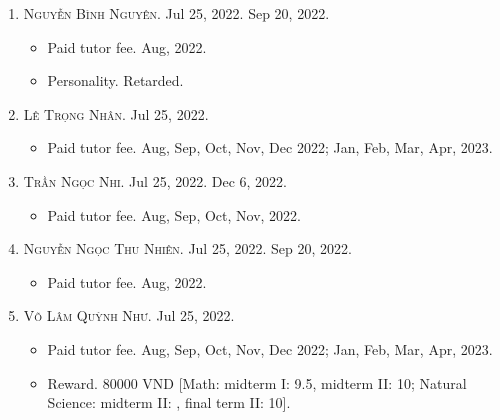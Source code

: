 \documentclass{article}
\begin{document}
\begin{enumerate}
	\begin{itemize}
		\item {\sf Paid tutor fee.} Aug, Sep, Oct, Nov, Dec 2022; Jan, Feb, Mar, Apr, 2023.
		\item {\sf Personality.} Introverted.
		\item {\sf Reward.} 1-euro coin $+$ 140000 VND [Math: midterm I: 9.5, final term I: 9, midterm II: 9.8, final term II: 9.75, final term: 9.75; Natural Science: midterm I: 10, final term I: 9.7, midterm II: ?, final term II: 9.5].
		\item {\sf Score.} \href{https://github.com/NQBH/hobby/blob/master/STEM/student/Nguyen_Nhu_Ngoc_grade_6_1st_semester.jpg}{NNN's 1st semester}.\footnote{The abbreviation of her name should not be confused with No Nut November.}
	\end{itemize}
	\item \textsc{Nguyễn Bình Nguyên.} {\sf[In]} Jul 25, 2022. {\sf[Out]} Sep 20, 2022.
	\begin{itemize}
		\item {\sf Paid tutor fee.} Aug, 2022.
		\item {\sf Personality.} Retarded.
	\end{itemize}
	\item \textsc{Lê Trọng Nhân.} {\sf[In]} Jul 25, 2022.
	\begin{itemize}
		\item {\sf Paid tutor fee.} Aug, Sep, Oct, Nov, Dec 2022; Jan, Feb, Mar, Apr, 2023.
	\end{itemize}
	\item \textsc{Trần Ngọc Nhi.} {\sf[In]} Jul 25, 2022. {\sf[Out]} Dec 6, 2022.
	\begin{itemize}
		\item {\sf Paid tutor fee.} Aug, Sep, Oct, Nov, 2022.
	\end{itemize}
	\item \textsc{Nguyễn Ngọc Thu Nhiên.} {\sf[In]} Jul 25, 2022. {\sf[Out]} Sep 20, 2022.
	\begin{itemize}
		\item {\sf Paid tutor fee.} Aug, 2022.
	\end{itemize}
	\item \textsc{Võ Lâm Quỳnh Như.} {\sf[In]} Jul 25, 2022.
	\begin{itemize}
		\item {\sf Paid tutor fee.} Aug, Sep, Oct, Nov, Dec 2022; Jan, Feb, Mar, Apr, 2023.
		\item {\sf Reward.} 80000 VND [Math: midterm I: 9.5, midterm II: 10; Natural Science: midterm II: , final term II: 10].

\end{itemize}
\end{enumerate}
\end{document}
